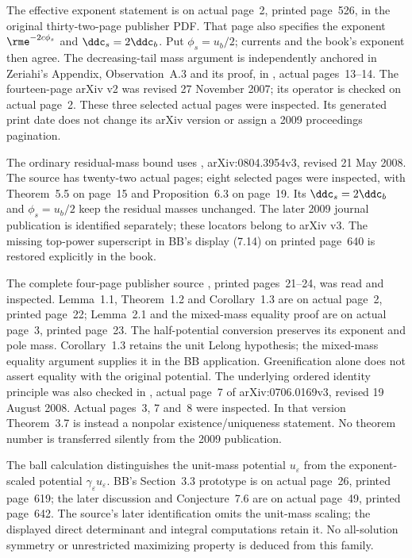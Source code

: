 The effective exponent statement is
\cite[Main Theorem~0.2(2)]{DK01} on actual page~2, printed
page~526, in the original thirty-two-page publisher PDF.
That page also specifies the exponent $\rme^{-2c\phi_s}$ and
$\ddc_s=2\ddc_b$. Put $\phi_s=u_b/2$; currents and
the book's exponent then agree. The decreasing-tail mass
argument is independently anchored in Zeriahi's Appendix,
Observation~A.3 and its proof, in
\cite{Demailly07LocalAlgebraV2}, actual pages~13--14.
The fourteen-page arXiv v2 was revised 27 November 2007;
its operator is checked on actual page~2. These three selected
actual pages were inspected. Its generated print date does not
change its arXiv version or assign a 2009 proceedings pagination.

The ordinary residual-mass bound uses
\cite[Theorem~5.5 and Proposition~6.3]{ACKPZ08PartialEnergyV3},
arXiv:0804.3954v3, revised 21 May 2008. The source has
twenty-two actual pages; eight selected pages were inspected,
with Theorem~5.5 on page~15 and Proposition~6.3 on page~19.
Its $\ddc_s=2\ddc_b$ and $\phi_s=u_b/2$ keep the
residual masses unchanged. The later 2009 journal publication
is identified separately; these locators belong to arXiv v3.
The missing top-power superscript in BB's display (7.14) on
printed page~640 is restored explicitly in the book.

The complete four-page publisher source
\cite{Rash15ExtremalPublished}, printed pages~21--24, was read
and inspected. Lemma~1.1, Theorem~1.2 and Corollary~1.3 are
on actual page~2, printed page~22; Lemma~2.1 and the
mixed-mass equality proof are on actual page~3, printed page~23.
The half-potential conversion preserves its exponent and pole
mass. Corollary~1.3 retains the unit Lelong hypothesis; the
mixed-mass equality argument supplies it in the BB application.
Greenification alone does not assert equality with the original
potential. The underlying ordered identity principle was also
checked in \cite[Theorem~3.6]{ACCH08PolarMeasuresV3}, actual
page~7 of arXiv:0706.0169v3, revised 19 August 2008.
Actual pages~3, 7 and~8 were inspected. In that version
Theorem~3.7 is instead a nonpolar existence/uniqueness statement.
No theorem number is transferred silently from the 2009 publication.

The ball calculation distinguishes the unit-mass potential
$u_\varepsilon$ from the exponent-scaled potential
$\gamma_\varepsilon u_\varepsilon$. BB's Section~3.3 prototype
is on actual page~26, printed page~619; the later discussion
and Conjecture~7.6 are on actual page~49, printed page~642.
The source's later identification omits the unit-mass scaling;
the displayed direct determinant and integral computations retain it.
No all-solution symmetry or unrestricted maximizing property
is deduced from this family.

